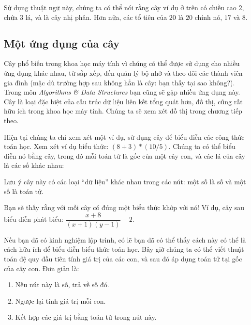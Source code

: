 Sử dụng thuật ngữ này, chúng ta có thể nói rằng cây ví dụ ở trên có chiều cao $2$, chứa $3$ lá, và là cây nhị phân. Hơn nữa, các tổ tiên của $20$ là $20$ chính nó, $17$ và $8$.

\subsection{Một ứng dụng của cây}

Cây phổ biến trong khoa học máy tính vì chúng có thể được sử dụng cho nhiều ứng dụng khác nhau, từ sắp xếp, đến quản lý bộ nhớ và theo dõi các thành viên gia đình (mặc dù trường hợp sau không hẳn là cây: bạn thấy tại sao không?). Trong môn \emph{Algorithms \& Data Structures} bạn cũng sẽ gặp nhiều ứng dụng này. Cây là loại đặc biệt của cấu trúc dữ liệu liên kết tổng quát hơn, đồ thị, cũng rất hữu ích trong khoa học máy tính. Chúng ta sẽ xem xét đồ thị trong chương tiếp theo.

Hiện tại chúng ta chỉ xem xét một ví dụ, sử dụng cây để biểu diễn các công thức toán học. Xem xét ví dụ biểu thức: $(8 + 3) * (10/5)$. Chúng ta có thể biểu diễn nó bằng cây, trong đó mỗi toán tử là gốc của một cây con, và các lá của cây là các số khác nhau:

\begin{center}
\end{center}

Lưu ý cây này có các loại ``dữ liệu'' khác nhau trong các nút: một số là số và một số là toán tử.

Bạn sẽ thấy rằng với mỗi cây có đúng một biểu thức khớp với nó! Ví dụ, cây sau biểu diễn phát biểu: $\dfrac{x + 8}{(x+1)(y-1)} - 2$.

Nếu bạn đã có kinh nghiệm lập trình, có lẽ bạn đã có thể thấy cách này có thể là cách hữu ích để biểu diễn biểu thức toán học. Bây giờ chúng ta có thể viết thuật toán đệ quy đầu tiên tính giá trị của các con, và sau đó áp dụng toán tử tại gốc của cây con. Đơn giản là:
\begin{enumerate}
\item Nếu nút này là số, trả về số đó.
\item Ngược lại tính giá trị mỗi con.
\item Kết hợp các giá trị bằng toán tử trong nút này.
\end{enumerate}

